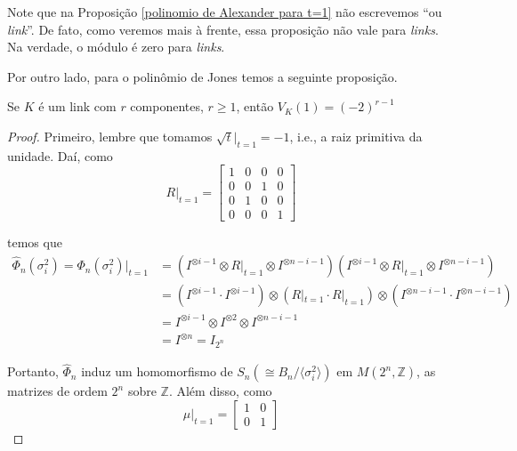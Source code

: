 	\par\vspace{0.3cm} Note que na Proposição \eqref{polinomio de Alexander para t=1} não escrevemos ``ou \textit{link}''. De fato, como veremos mais à frente, essa proposição não vale para \textit{links}. Na verdade, o módulo é zero para \textit{links}. 
	\par\vspace{0.3cm} Por outro lado, para o polinômio de Jones temos a seguinte proposição.
	\begin{prop}
		\label{polinomio de Jones para links}
		Se $K$ é um link com $r$ componentes, $r\geq 1$, então $V_K(1) = (-2)^{r-1}$
	\end{prop}
	\begin{proof}
		Primeiro, lembre que tomamos $\sqrt{t}|_{t=1} = -1$, i.e., a raiz primitiva da unidade. Daí, como
		\begin{equation*}
		R|_{t=1} = \begin{bmatrix}
		1 & 0 & 0 & 0 \\
		0 & 0 & 1 & 0 \\
		0 & 1 & 0 & 0 \\
		0 & 0 & 0 & 1
		\end{bmatrix}
		\end{equation*}
		\par\vspace{0.3cm} temos que
		\begin{align*}
		\widehat{\Phi}_n(\sigma_i^2) = \Phi_n(\sigma_i^2)|_{t=1} &= ( I^{\otimes i-1} \otimes R|_{t=1} \otimes I^{\otimes n-i-1} )( I^{\otimes i-1} \otimes R|_{t=1} \otimes I^{\otimes n-i-1} ) \\
		&= ( I^{\otimes i-1}\cdot I^{\otimes i-1} )\otimes( R|_{t=1}\cdot R|_{t=1} )\otimes( I^{\otimes n-i-1}\cdot I^{\otimes n-i-1} ) \\
		&= I^{\otimes i-1}\otimes I^{\otimes 2}\otimes I^{\otimes n-i-1} \\
		&= I^{\otimes n} = I_{2^n}
		\end{align*}
		\par\vspace{0.3cm} Portanto, $\widehat{\Phi}_n$ induz um homomorfismo de $S_n ( \cong B_n/\langle \sigma_i^2 \rangle )$ em $M(2^n, \mathbb{Z})$, as matrizes de ordem $2^n$ sobre $\mathbb{Z}$. Além disso, como
		\begin{equation*}
		\mu|_{t=1} = \begin{bmatrix}
		1 & 0 \\
		0 & 1
		\end{bmatrix}

\end{equation*}
\end{proof}
